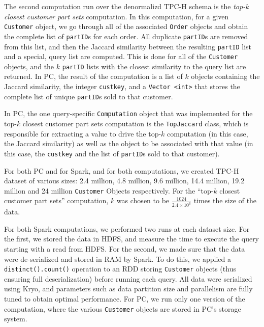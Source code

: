 The second computation run over the denormalizd TPC-H schema is the \emph{top-k closest customer part sets} computation.
In this computation, 
for a given
\texttt{Customer} object, we go through all of the associated 
\texttt{Order} objects and obtain the complete list of
\texttt{partID}s for each order.  All duplicate \texttt{partID}s are
removed from this list, and then the Jaccard similarity between the resulting \texttt{partID} list and a special, query
list are computed.  This is done for all of the \texttt{Customer} objects, and the $k$ \texttt{partID} lists with the 
closest similarity to the query list are returned.
In PC,
the result of the computation is a list of $k$ objects containing the Jaccard similarity, the integer \texttt{custkey}, and
a \texttt{Vector <int>} that stores the complete list of unique
\texttt{partID}s sold to that customer.

In PC, the one query-specific \texttt{Computation} object that was implemented for the top-$k$ 
closest customer part sets computation is the \texttt{TopJaccard} class, which
is responsible for extracting a value to drive the top-$k$ computation (in this case, the Jaccard similarity) as well
as the object to be associated with that value (in this case, the \texttt{custkey} and the list of 
\texttt{partID}s sold to that customer).

For both PC and for Spark, and for both computations, we created 
TPC-H dataset of various sizes: 2.4 million,
4.8 million, 9.6 million, 14.4 million, 19.2 million and 24 million
\texttt{Customer} Objects respectively.  For the ``top-$k$
closest customer part sets'' computation, $k$ was chosen to be $\frac{1024}{2.4 \times 10^6}$ times the size
of the data.

For both Spark computations, we performed two runs at each dataset size.
For the first, we stored the data in HDFS, and measure the time to execute the query starting with a
read from HDFS.
For the second, we made sure that the data were de-serialized and stored in RAM by Spark.
To do this, we applied a \texttt{distinct().count()} operation to
an RDD storing \texttt{Customer} objects (thus ensuring full deserialization) before running each query.
All data were
serialized using Kryo, and parameters such as data partition size and parallelism are fully tuned to obtain
optimal performance. 
For PC, we run only one version of the computation, where the various \texttt{Customer} objects are stored in
PC's storage system.


